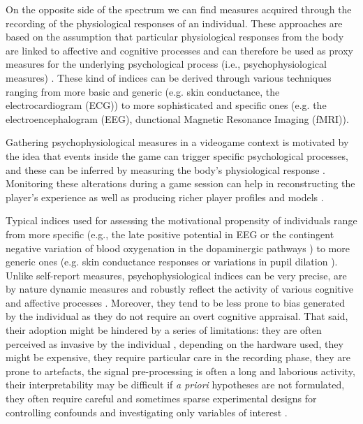 On the opposite side of the spectrum we can find measures acquired through the recording of the physiological responses of an individual. These approaches are based on the assumption that particular physiological responses from the body are linked to affective and cognitive processes and can therefore be used as proxy measures for the underlying psychological process (i.e., psychophysiological measures) \cite{cacioppo2007handbook}. These kind of indices can be derived through various techniques ranging from more basic and generic (e.g. skin conductance, the electrocardiogram (ECG)) to more sophisticated and specific ones (e.g. the electroencephalogram (EEG), dunctional Magnetic Resonance Imaging (fMRI)). 

Gathering psychophysiological measures in a videogame context is motivated by the idea that events inside the game can trigger specific psychological processes, and these can be inferred by measuring the body’s physiological response \cite{yannakakis2013player, drachen2018games}. Monitoring these  alterations during a game session can help in reconstructing the player's experience \cite{mirza2013does} as well as producing richer player profiles and models \cite{yannakakis2013player}. 

Typical indices used for assessing the motivational propensity of individuals range from more specific (e.g., the late positive potential in EEG or the contingent negative variation of blood oxygenation in the dopaminergic pathways \cite{cacioppo2007handbook}) to more generic ones (e.g. skin conductance responses or variations in pupil dilation \cite{cacioppo2007handbook}). Unlike self-report measures, psychophysiological indices can be very precise, are by nature dynamic measures and robustly reflect the activity of various cognitive and affective processes \cite{cacioppo2007handbook}. Moreover, they tend to be less prone to bias generated by the individual as they do not require an overt cognitive appraisal. That said, their adoption might be hindered by a series of limitations: they are often perceived as invasive by the individual \cite{yannakakis2013player}, depending on the hardware used, they might be expensive, they require particular care in the recording phase, they are prone to artefacts, the signal pre-processing is often a long and laborious activity, their interpretability may be difficult if  \textit{a priori} hypotheses are not formulated, they often require careful and sometimes sparse experimental designs for controlling confounds and investigating only variables of interest \cite{liu2017toward}.
    
